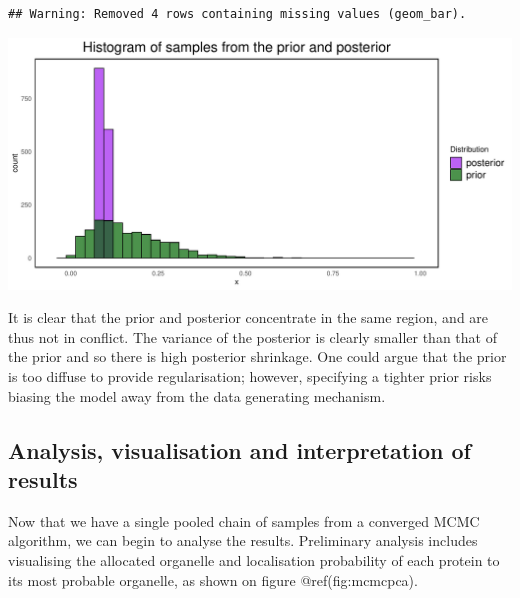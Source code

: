 \documentclass[
]{article}
\begin{document}
\begin{verbatim}
## Warning: Removed 4 rows containing missing values (geom_bar).
\end{verbatim}

\includegraphics[width=0.7\linewidth]{F1000TAGMworkflow_rev1_files/figure-latex/unnamed-chunk-24-1}

It is clear that the prior and posterior concentrate in the same region,
and are thus not in conflict. The variance of the posterior is clearly
smaller than that of the prior and so there is high posterior shrinkage.
One could argue that the prior is too diffuse to provide regularisation;
however, specifying a tighter prior risks biasing the model away from
the data generating mechanism.

\hypertarget{analysis-visualisation-and-interpretation-of-results}{%
\subsection{Analysis, visualisation and interpretation of
results}\label{analysis-visualisation-and-interpretation-of-results}}

Now that we have a single pooled chain of samples from a converged MCMC
algorithm, we can begin to analyse the results. Preliminary analysis
includes visualising the allocated organelle and localisation
probability of each protein to its most probable organelle, as shown on
figure @ref(fig:mcmcpca).
\end{document}
